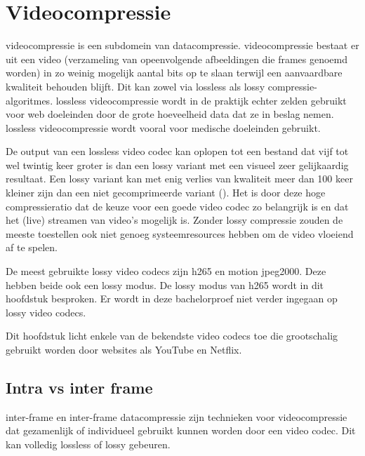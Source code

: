 \chapter{Videocompressie}
\label{ch:videocompressie}

\Gls{videocompressie} is een subdomein van \gls{datacompressie}. \Gls{videocompressie} bestaat er uit een video (verzameling van opeenvolgende afbeeldingen die frames genoemd worden) in zo weinig mogelijk aantal \glspl{bit} op te slaan terwijl een aanvaardbare kwaliteit behouden blijft. Dit kan zowel via \gls{lossless} als \gls{lossy} \glspl{compressie-algoritme}. \Gls{lossless} \gls{videocompressie} wordt in de praktijk echter zelden gebruikt voor web doeleinden door de grote hoeveelheid data dat ze in beslag nemen. \Gls{lossless} \gls{videocompressie} wordt vooral voor medische doeleinden gebruikt.

De output van een \gls{lossless} video \gls{codec} kan oplopen tot een bestand dat vijf tot wel twintig keer groter is dan een \gls{lossy} variant met een visueel zeer gelijkaardig resultaat. Een \gls{lossy} variant kan met enig verlies van kwaliteit meer dan 100 keer kleiner zijn dan een niet gecomprimeerde variant (\cite{importancelossyvidecodecs}). Het is door deze hoge \gls{compressieratio} dat de keuze voor een goede video \gls{codec} zo belangrijk is en dat het (live) streamen van video's mogelijk is. Zonder \gls{lossy} compressie zouden de meeste toestellen ook niet genoeg systeemresources hebben om de video vloeiend af te spelen.

De meest gebruikte \gls{lossy} video \glspl{codec} zijn \gls{h265} en motion \gls{jpeg2000}. Deze hebben beide ook een \gls{lossy} modus. De \gls{lossy} modus van \gls{h265} wordt in dit hoofdstuk besproken. Er wordt in deze bachelorproef niet verder ingegaan op \gls{lossy} video \glspl{codec}.

Dit hoofdstuk licht enkele van de bekendste video \glspl{codec} toe die grootschalig gebruikt worden door websites als YouTube en Netflix.

\section{Intra vs inter frame}
\label{sec:videocompressie-intra-inter}

\Gls{inter-frame} en \gls{inter-frame} \gls{datacompressie} zijn technieken voor \gls{videocompressie} dat gezamenlijk of individueel gebruikt kunnen worden door een video \gls{codec}. Dit kan volledig \gls{lossless} of \gls{lossy} gebeuren.

